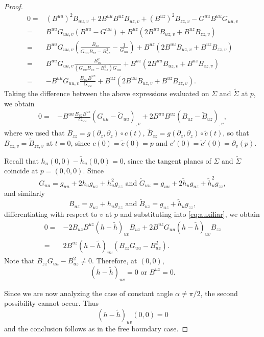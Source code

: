 \documentclass[10pt,a4paper]{amsart}
\begin{document}
\begin{proof}
\begin{align*}
    0 = & (B^{uu})^2B_{uu,v}+2B^{uu}B^{uz}B_{uz,v}+(B^{uz})^2B_{zz,v}-G^{uu}B^{uu}G_{uu,v} \\
    = & B^{uu}G_{uu,v}(B^{uu}-G^{uu})+B^{uz}(2B^{uu}B_{uz,v}+B^{uz}B_{zz,v}) \\
    = & B^{uu}G_{uu,v}\left(\frac{B_{zz}}{G_{uu}B_{zz}-B_{uz}^2}-\frac{1}{G_{uu}}\right)+B^{uz}(2B^{uu}B_{uz,v}+B^{uz}B_{zz,v}) \\
    = & B^{uu}G_{uu,v}\frac{B_{uz}^2}{(G_{uu}B_{zz}-B_{uz}^2)G_{uu}}+B^{uz}(2B^{uu}B_{uz,v}+B^{uz}B_{zz,v}) \\
    = & -B^{uu}G_{uu,v}\frac{B_{uz}B^{uz}}{G_{uu}}+B^{uz}(2B^{uu}B_{uz,v}+B^{uz}B_{zz,v}).
\end{align*}
Taking the difference between the above expressions evaluated on $\Sigma$ and $\widetilde{\Sigma}$ at $p$, we obtain
\begin{align}\label{eq:auxiliar}
    0%
    = & -B^{uu}\frac{B_{uz}B^{uz}}{G_{uu}}(G_{uu}-\widetilde{G}_{uu})_{,v} + 2B^{uu}B^{uz}(B_{uz}-\widetilde{B}_{uz})_{,v},
\end{align}
where we used that $B_{zz}=g(\partial_z,\partial_z)\circ c(t)$, $\widetilde{B}_{zz}=g(\partial_z,\partial_z)\circ \widetilde{c}(t)$, so that $B_{zz,v}=\widetilde{B}_{zz,v}$ at $t=0$, since $c(0)=\widetilde{c}(0)=p$ and $c'(0)=\widetilde{c}'(0)=\partial_v(p)$. 

Recall that $h_u(0,0)-\widetilde{h}_u(0,0)=0$, since the tangent planes of $\Sigma$ and $\widetilde{\Sigma}$ coincide at $p=(0,0,0)$. Since
\begin{equation*}
    G_{uu}=g_{uu}+2h_u g_{uz} + h^2_u g_{zz} \text{ and } \widetilde{G}_{uu}=g_{uu}+2\widetilde{h}_u g_{uz} + \widetilde{h}^2_u g_{zz},
\end{equation*}
and similarly
\begin{equation*}
    B_{uz}=g_{uz}+h_u g_{zz} \text{ and } \widetilde{B}_{uz}=g_{uz}+\widetilde{h}_u g_{zz},
\end{equation*}
differentiating with respect to $v$ at $p$ and substituting into \eqref{eq:auxiliar}, we obtain
\begin{align*}
    0= & -2B_{uz}B^{uz}(h-\widetilde{h})_{uv}B_{uz}+2B^{uz}G_{uu}(h-\widetilde{h})_{uv} B_{zz} \\
    = & 2B^{uz}(h-\widetilde{h})_{uv}(B_{zz}G_{uu}-B_{uz}^2).
\end{align*}
Note that $B_{zz}G_{uu}-B^2_{uz}\neq 0$. Therefore, at $(0,0)$,
\begin{equation*}
    (h-\widetilde{h})_{uv}=0 \text{ or } B^{uz}=0. 
\end{equation*}

Since we are now analyzing the case of constant angle $\alpha\neq \pi/2$, the second possibility cannot occur. Thus
\begin{equation*}
    (h-\widetilde{h})_{uv}(0,0)=0 
\end{equation*}
and the conclusion follows as in the free boundary case.    
\end{proof}
\end{document}
